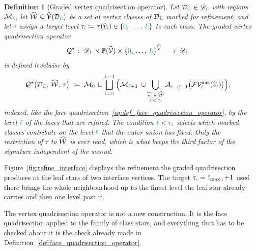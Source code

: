 \documentclass[a4paper, 12pt]{article}
\makeatletter
\newcommand{\quadriV}{\mathcal{Q}^{\star}}                       %
\newcommand{\quadriVup}[1]{\quadriV_{\rightarrow #1}}            %
\newcommand{\lmaxIdx}[1]{\l_{\max,#1}}
\newcommand{\targetlevel}{\tau}                                 %
\newcommand{\green}{\color{ForestGreen}}
\newcommand{\brickred}{\color{BrickRed}}
\newcommand{\V}{\mathcal{V}}
\newcommand{\F}{\mathcal{F}}
\newcommand{\vertexClass}[1]{\widehat{v}_{#1}}
\newcommand{\vertexClasses}{\widehat{\V}}
\DeclareRobustCommand{\markedVertexClasses}[1][]{\widehat{\mathcal{W}}\ifx\@empty#1\@empty\else^{#1}\fi}
\newcommand{\coarseIdxone}{{\brickred i}}
\renewcommand{\l}{{\green\ell}}
\renewcommand{\L}{{\green L}}
\newcommand{\lzero}{{\green 0}}
\newcommand{\Aop}[3]{\mathcal{A}^{#1}_{{#2} \to {#3}}}
\renewcommand{\powerset}{\mathbb{P}}
\newcommand{\M}{\mathcal{M}}
\newtheorem{definition}[theorem]{Definition}
\theoremstyle{definition}
\theoremstyle{plain}
\numberwithin{equation}{section}
\newcommand{\tobecut}[1]{{\color{red} #1}}     %
\DeclareRobustCommand{\domseq}[1][]{\mathcal{D}\ifx\@empty#1\@empty\else_{#1}\fi}
\newcommand{\alldomseqs}{\mathscr{D}}
\newcommand{\FVanc}[1]{\F\V^{\mathrm{anc}}_{#1}}            %
\makeatother
\begin{document}
\begin{definition}[Graded vertex quadrisection operator]
    \label{def:graded_vertex_quadrisection}
    Let $\domseq[\L] \in \alldomseqs_\L$ with regions $\M_\l$, let $\markedVertexClasses \subseteq \vertexClasses(\domseq[\L])$ be a set of vertex classes of $\domseq[\L]$ marked for refinement, and let $\targetlevel$ assign a target level $\targetlevel_\coarseIdxone \coloneq \targetlevel(\vertexClass{\coarseIdxone}) \in \{ \lzero, \, \dots, \, \L \}$ to each class. The \emph{graded vertex quadrisection operator}
    \begin{equation}
        \quadriV \; \colon \; \alldomseqs_\L \times \powerset(\vertexClasses) \times \{ \lzero, \, \dots, \, \L \}^{\vertexClasses} \; \longrightarrow \; \alldomseqs_\L
    \end{equation}
    is defined levelwise by
    \begin{equation}
        \label{eq:graded_vertex_quadrisection}
        \quadriV \big( \domseq[\L], \, \markedVertexClasses, \, \targetlevel \big) \; \coloneq \; \M_\lzero \, \sqcup \bigsqcup\limits_{\l = \lzero}^{\L-1} \Big( \M_{\l+1} \; \cup \bigcup\limits_{\substack{\vertexClass{\coarseIdxone} \, \in \, \markedVertexClasses \\ \l \, < \, \targetlevel_\coarseIdxone}} \Aop{}{\l}{\l+1} \big( \FVanc{\l}(\vertexClass{\coarseIdxone}) \big) \Big),
    \end{equation}
    indexed, like the face quadrisection~\eqref{eq:def_face_quadrisection_operator}, by the level $\l$ of the faces that are refined. The condition $\l < \targetlevel_\coarseIdxone$ selects which marked classes contribute on the level $\l$ that the outer union has fixed. Only the restriction of $\targetlevel$ to $\markedVertexClasses$ is ever read, which is what keeps the third factor of the signature independent of the second.
\end{definition}

Figure~\ref{fig:refine_interface} displays the refinement the graded quadrisection produces at the leaf stars of two interface vertices. The target $\targetlevel_\coarseIdxone = \lmaxIdx{\coarseIdxone} \! + \! 1$ used there brings the whole neighbourhood up to the finest level the leaf star already carries and then one level past it.

The vertex quadrisection operator is not a new construction. It is the face quadrisection applied to the family of class stars, and everything that has to be checked about it is the check already made in Definition~\ref{def:face_quadrisection_operator}.
\end{document}

